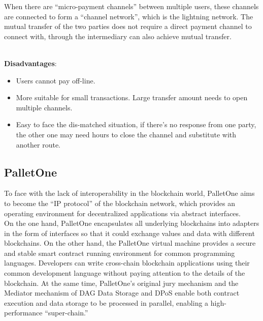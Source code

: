 \noindent When there are ``micro-payment channels'' between multiple users, these channels are connected to form a ``channel network'', which is the lightning network. The mutual transfer of the two parties does not require a direct payment channel to connect with, through the intermediary can also achieve mutual transfer. \\ \\
\noindent \begin{large}
\textbf{Disadvantages}:
\end{large}
\begin{itemize}
    \item Users cannot pay off-line. 
    \item More suitable for small transactions. Large transfer amount needs to open multiple channels.
    \item Easy to face the dis-matched situation, if there's no response from one party, the other one may need hours to close the channel and substitute with another route.
\end{itemize}













\subsection{PalletOne}
\noindent To face with the lack of interoperability in the blockchain world, PalletOne aims to become the ``IP protocol'' of the blockchain network, which provides an operating environment for decentralized applications via abstract interfaces.\cite{palletone} \\

\noindent On the one hand, PalletOne encapsulates all underlying blockchains into adapters in the form of interfaces so that it could exchange values and data with different blockchains. On the other hand, the PalletOne virtual machine provides a secure and stable smart contract running environment for common programming languages. Developers can write cross-chain blockchain applications using their common development language without paying attention to the details of the blockchain. At the same time, PalletOne's original jury mechanism and the Mediator mechanism of DAG Data Storage and DPoS enable both contract execution and data storage to be processed in parallel, enabling a high-performance ``super-chain.''\\

